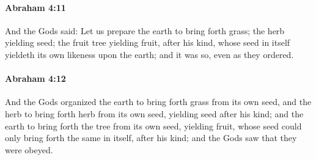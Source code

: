 		\paragraph{Abraham 4:11} %
			\label{ABRAHAM-4-11}

			And the Gods said: Let us prepare the earth to bring forth grass; the herb yielding seed; the fruit tree yielding fruit, after his kind, whose seed in itself yieldeth its own likeness upon the earth; and it was so, even as they ordered.


		\paragraph{Abraham 4:12} %
			\label{ABRAHAM-4-12}

			And the Gods organized the earth to bring forth grass from its own seed, and the herb to bring forth herb from its own seed, yielding seed after his kind; and the earth to bring forth the tree from its own seed, yielding fruit, whose seed could only bring forth the same in itself, after his kind; and the Gods saw that they were obeyed.


